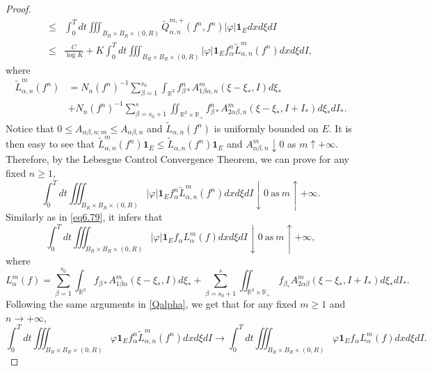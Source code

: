 \documentclass[reqno,11pt]{amsart}
\numberwithin{equation}{section}
\def\R{\mathbb{R}}
\begin{document}
\begin{proof}
\begin{equation*}
{\begin{aligned}
			\leq & \int_{0}^{T}dt  \iiint_{B_R \times B_R \times(0,R)} \tilde{Q}^{m, +} _{\alpha ,n }(f^n,f^n) | \varphi | \mathbf{1}_E  dxd\xi dI \\
\leq & \tfrac{C}{\log K} + K \int_{0}^{T}dt  \iiint_{B_R\times B_R\times(0,R) } | \varphi | \mathbf{1}_E f^n_\alpha \tilde{L}^m_{\alpha ,n} (f^n) dxd\xi dI,
		\end{aligned}}
	\end{equation*}
	where 
		\begin{align*}
			\tilde{L}^m_{\alpha ,n} (f^n) &= N_n (f^n)^{-1} \sum \limits_{\beta =1}^{s_0} \int_{\R^3} f^n_{\beta *} A^m_{1\beta \alpha ,n }(\xi -\xi_* ,I)d\xi_*\\
			& + N_n (f^n)^{-1} \sum \limits_{\beta =s_0+1}^{s} \iint_{\R^3\times \R_+} f^n_{\beta *} A^m_{2\alpha \beta ,n }(\xi -\xi_* ,I+I_*)d\xi_* dI_*.
		\end{align*}
Notice that $0\leq A_{\alpha \beta ,n;m}\leq A_{\alpha \beta,n}$ and $\tilde{L}_{\alpha ,n} (f^n)$ is uniformly bounded on $E$. It is then easy to see that $\tilde{L}^m_{\alpha ,n} (f^n) \mathbf{1}_E \leq \tilde{L}_{\alpha ,n} (f^n) \mathbf{1}_E$ and $A^m_{\alpha \beta,n} \downarrow 0$ as $m \uparrow +\infty$. Therefore, by the Lebesgue Control Convergence Theorem, we can prove for any fixed $n \geq 1$,
	\begin{equation}\label{eq6.79}
		\int_{0}^{T} dt \iiint_{B_R \times B_R \times(0,R)} | \varphi | \mathbf{1}_E f^n_\alpha \tilde{L}^m_{\alpha ,n} (f^n) dxd\xi dI \downarrow 0 \ \text{as}\ m \uparrow +\infty.
	\end{equation}
	Similarly as in \eqref{eq6.79}, it infers that
	\begin{equation}\label{eq6.80}
		\int_{0}^{T} dt \iiint_{B_R \times B_R \times(0,R)} | \varphi | \mathbf{1}_E f_\alpha L^m_{\alpha } (f) dxd\xi dI \downarrow 0 \ \text{as}\  m \uparrow +\infty,  
	\end{equation}
	where 
	\begin{equation*}
		L^m_{\alpha } (f) =  \sum \limits_{\beta =1}^{s_0} \int_{\R^3} f_{\beta *} A^m_{1\beta \alpha}(\xi -\xi_* ,I)d\xi_* + \sum \limits_{\beta =s_0+1}^{s} \iint_{\R^3\times \R_+} f_{\beta_*} A^m_{2\alpha \beta }(\xi -\xi_* ,I+I_*)d\xi_* dI_*.
	\end{equation*}
Following the same arguments in \eqref{Qalpha}, we get that for any fixed $m\geq 1$ and $n\rightarrow + \infty$, 
	\begin{equation}\label{eq6.81}
		\int_{0}^{T} dt \iiint_{B_R \times B_R \times(0,R)} \varphi \mathbf{1}_E f^n_\alpha \tilde{L}^m_{\alpha ,n} (f^n) dxd\xi dI \rightarrow \int_{0}^{T} dt \iiint_{B_R \times B_R \times(0,R)} \varphi \mathbf{1}_E f_\alpha L^m_{\alpha } (f) dxd\xi dI.

\end{equation}
\end{proof}
\end{document}
